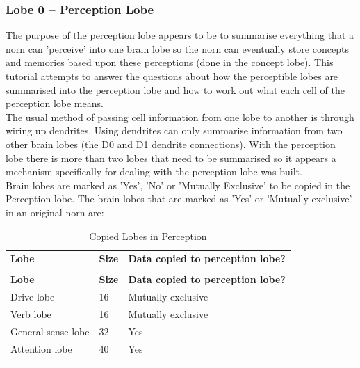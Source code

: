 \documentclass[11pt,twoside,a4paper]{article}
\begin{document}
\clearpage

\subsubsection{Lobe 0 -- Perception Lobe}


The purpose of the perception lobe appears to be to summarise everything that a norn can 'perceive' into one brain lobe so the norn can eventually store concepts and memories based upon these perceptions (done in the concept lobe). This tutorial attempts to answer the questions about how the perceptible lobes are summarised into the perception lobe and how to work out what each cell of the perception lobe means.~\\

The usual method of passing cell information from one lobe to another is through wiring up dendrites. Using dendrites can only summarise information from two other brain lobes (the D0 and D1 dendrite connections). With the perception lobe there is more than two lobes that need to be summarised so it appears a mechanism specifically for dealing with the perception lobe was built.~\\

Brain lobes are marked as 'Yes', 'No' or 'Mutually Exclusive' to be copied in the Perception lobe. The brain lobes that are marked as 'Yes' or 'Mutually exclusive' in an original norn are:
\begin{longtable}{|p{}|p{}|p{}|}
	\hline \rowcolor[gray]{0.50} \multicolumn{3}{|c|}{Copied Lobes in Perception} \\
	\hline \rowcolor[gray]{0.75} \textbf{Lobe} & \textbf{Size} & \textbf{Data copied to perception lobe?} \\ \hline
	\endfirsthead
	\hline \rowcolor[gray]{0.50} \multicolumn{3}{|c|}{Copied Lobes in Perception} \\
	\hline \rowcolor[gray]{0.75} \textbf{Lobe} & \textbf{Size} & \textbf{Data copied to perception lobe?} \\ \hline
	\endhead
	\hline 
	\endfoot
	Drive lobe		&	16 &	Mutually exclusive \\ \hline
	Verb lobe		&	16 &	Mutually exclusive \\ \hline
	General sense lobe	&	32 &	Yes \\ \hline
	Attention lobe 		&	40 &	Yes \\ \hline
	\caption{Copied Lobes in Perception}
	\label{tab:Copied_Lobes_in_Perception}\\
\end{longtable}
\end{document}
